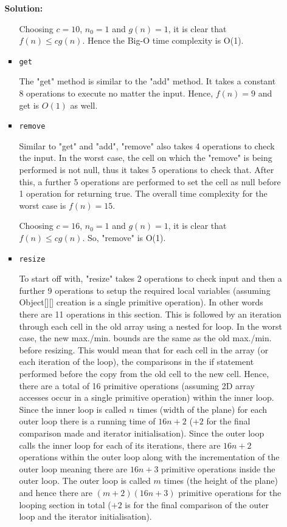 \documentclass[a4,13pt]{extarticle}
\newenvironment{Solution}{\color{blue}\textbf{Solution:}}{}
\begin{document}
\begin{enumerate}
\begin{enumerate}
\begin{Solution}
\begin{itemize}
						Choosing $c = 10$, $n_0 = 1$ and $g(n) = 1$, it is clear that $f(n) \leq cg(n)$. Hence the Big-O time complexity is O(1).
					\item \texttt{get}

						The "get" method is similar to the "add" method. It takes a constant 8 operations to execute no matter the input. Hence, $f(n) = 9$ and get is $O(1)$ as well.
					\item \texttt{remove}
					
						Similar to "get" and "add", "remove" also takes 4 operations to check the input. In the worst case, the cell on which the "remove" is being performed is not null, thus it takes 5 operations to check that. After this, a further 5 operations are performed to set the cell as null before 1 operation for returning true. The overall time complexity for the worst case is $f(n) = 15$.

						Choosing $c = 16$, $n_0 = 1$ and $g(n) = 1$, it is clear that $f(n) \leq cg(n)$. So, "remove" is O(1).
					\item \texttt{resize}

						To start off with, "resize" takes 2 operations to check input and then a further 9 operations to setup the required local variables (assuming Object[][] creation is a single primitive operation). In other words there are 11 operations in this section.
						\medskip
						This is followed by an iteration through each cell in the old array using a nested for loop. In the worst case, the new max./min. bounds are the same as the old max./min. before resizing. This would mean that for each cell in the array (or each iteration of the loop), the comparisons in the if statement performed before the copy from the old cell to the new cell. Hence, there are a total of 16 primitive operations (assuming 2D array accesses occur in a single primitive operation) within the inner loop. Since the inner loop is called $n$ times (width of the plane) for each outer loop there is a running time of $16n + 2$ ($+ 2$ for the final comparison made and iterator initialisation).
						\medskip
						Since the outer loop calls the inner loop for each of its iterations, there are $16n + 2$ operations within the outer loop along with the incrementation of the outer loop meaning there are $16n + 3$ primitive operations inside the outer loop. The outer loop is called $m$ times (the height of the plane) and hence there are $(m + 2)(16n + 3)$ primitive operations for the looping section in total ($+ 2$ is for the final comparison of the outer loop and the iterator initialisation). 


\end{itemize}
\end{Solution}
\end{enumerate}
\end{enumerate}
\end{document}
